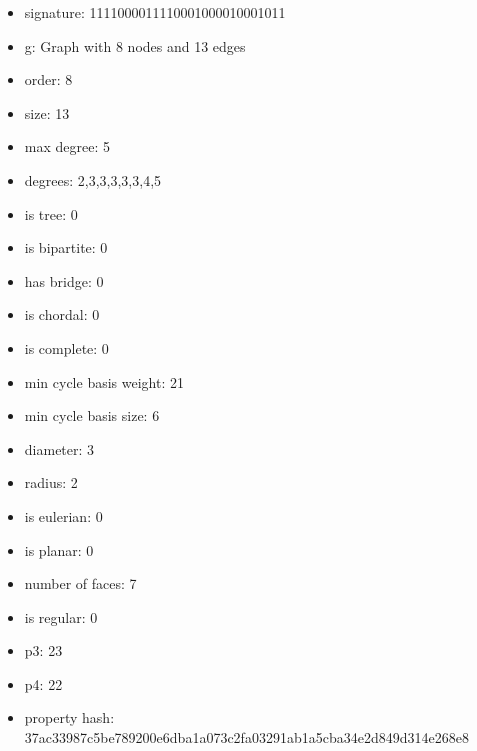 \begin{itemize}
\item signature: 1111000011110001000010001011
\item g: Graph with 8 nodes and 13 edges
\item order: 8
\item size: 13
\item max degree: 5
\item degrees: 2,3,3,3,3,3,4,5
\item is tree: 0
\item is bipartite: 0
\item has bridge: 0
\item is chordal: 0
\item is complete: 0
\item min cycle basis weight: 21
\item min cycle basis size: 6
\item diameter: 3
\item radius: 2
\item is eulerian: 0
\item is planar: 0
\item number of faces: 7
\item is regular: 0
\item p3: 23
\item p4: 22
\item property hash: 37ac33987c5be789200e6dba1a073c2fa03291ab1a5cba34e2d849d314e268e8
\end{itemize}
\newpage
\begin{figure}
\end{figure}
